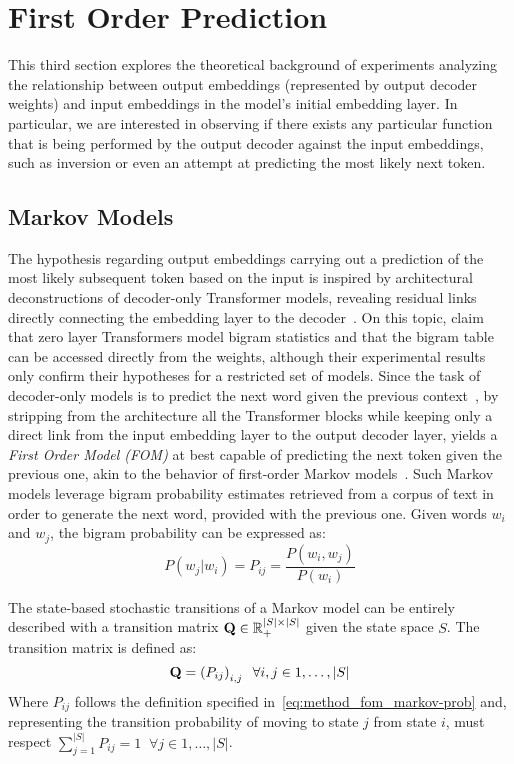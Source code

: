 \section{First Order Prediction}\label{sec:method_fom}

This third section explores the theoretical background of experiments analyzing the relationship between output embeddings (represented by output decoder weights) and input embeddings in the model's initial embedding layer.
In particular, we are interested in observing if there exists any particular function that is being performed by the output decoder against the input embeddings, such as inversion or even an attempt at predicting the most likely next token.

\subsection{Markov Models}

The hypothesis regarding output embeddings carrying out a prediction of the most likely subsequent token based on the input is inspired by architectural deconstructions of decoder-only Transformer models, revealing residual links directly connecting the embedding layer to the decoder~\cite{vaswani2017}.
On this topic, \citet{elhage2021} claim that zero layer Transformers model bigram statistics and that the bigram table can be accessed directly from the weights, although their experimental results only confirm their hypotheses for a restricted set of models.
Since the task of decoder-only models is to predict the next word given the previous context~\cite{radford2019}, by stripping from the architecture all the Transformer blocks while keeping only a direct link from the input embedding layer to the output decoder layer, yields a \emph{First Order Model (FOM)} at best capable of predicting the next token given the previous one, akin to the behavior of first-order Markov models~\cite{markov2006}.
Such Markov models leverage bigram probability estimates retrieved from a corpus of text in order to generate the next word, provided with the previous one.
Given words $w_i$ and $w_j$, the bigram probability can be expressed as:
\begin{equation}
    \label{eq:method_fom_markov-prob}
    P(w_j|w_i) = P_{ij} = \frac{P(w_i, w_j)}{P(w_i)}
\end{equation}

The state-based stochastic transitions of a Markov model can be entirely described with a transition matrix $\bm{\mathbf{Q}} \in \mathbb {R}_{+}^{|S| \times |S|}$ given the state space $S$.
The transition matrix is defined as:
\begin{equation*}
    \bm{\mathbf{Q}} = \left(P_{ij}\right)_{i,j} \;\; \forall i,j \in 1,\dots,|S|
\end{equation*}
Where $P_{ij}$ follows the definition specified in~\cref{eq:method_fom_markov-prob} and, representing the transition probability of moving to state $j$ from state $i$, must respect $\sum_{j=1}^{|S|}{P_{ij}} = 1 \;\; \forall j \in 1,\dots,|S|$.

